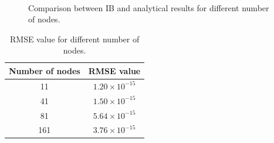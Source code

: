 \begin{figure}[H]
    \centering
    \quad
    \\
    \quad
    \caption{Comparison between IB and analytical results for different number of nodes.}
    \label{fig:C3_indirectForcing_nodeNumber}
\end{figure}

\begin{table}[H]
\centering
\begin{tabular}{c | c}
     Number of nodes & RMSE value \\ \hline \hline
     11 & $1.20 \times 10^{-15}$ \\ \hline
     41 & $1.50 \times 10^{-15}$ \\ \hline
     81 & $5.64 \times 10^{-15}$ \\ \hline
     161 & $3.76 \times 10^{-15}$
\end{tabular}
\caption{RMSE value for different number of nodes.}
\label{table:C3_indirectForcing_nodeNumberRSME}
\end{table}

